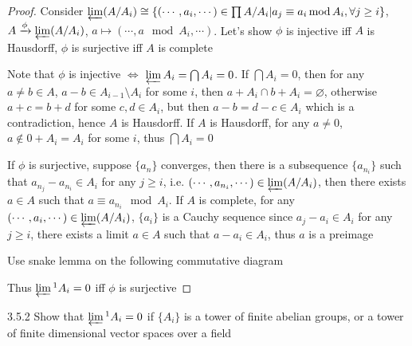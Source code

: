 \documentclass[../main.tex]{subfiles}
\begin{document}
\begin{proof}
Consider $\varprojlim(A/A_i)\cong\left\{(\cdots,a_i,\cdots)\in \prod A/A_i\middle|a_j\equiv a_i\mod A_i, \forall j\geq i\right\}$, $A\xrightarrow\phi\varprojlim(A/A_i)$, $a\mapsto(\cdots,a\mod A_i,\cdots)$. Let's show $\phi$ is injective iff $A$ is Hausdorff, $\phi$ is surjective iff $A$ is complete \par
Note that $\phi$ is injective $\Leftrightarrow$ $\varprojlim A_i=\bigcap A_i=0$. If $\bigcap A_i=0$, then for any $a\neq b\in A$, $a-b\in A_{i-1}\setminus A_{i}$ for some $i$, then $a+A_{i}\cap b+A_i=\varnothing$, otherwise $a+c=b+d$ for some $c,d\in A_i$, but then $a-b=d-c\in A_i$ which is a contradiction, hence $A$ is Hausdorff. If $A$ is Hausdorff, for any $a\neq0$, $a\notin 0+A_i=A_i$ for some $i$, thus $\bigcap A_i=0$ \par
If $\phi$ is surjective, suppose $\{a_n\}$ converges, then there is a subsequence $\{a_{n_i}\}$ such that $a_{n_j}-a_{n_i}\in A_i$ for any $j\geq i$, i.e. $(\cdots,a_{n_i},\cdots)\in \varprojlim(A/A_i)$, then there exists $a\in A$ such that $a\equiv a_{n_i}\mod A_i$. If $A$ is complete, for any $(\cdots,a_i,\cdots)\in\varprojlim(A/A_i)$, $\{a_i\}$ is a Cauchy sequence since $a_j-a_i\in A_i$ for any $j\geq i$, there exists a limit $a\in A$ such that $a-a_i\in A_i$, thus $a$ is a preimage \par
Use snake lemma on the following commutative diagram
\begin{center}
\end{center}
Thus $\varprojlim\textstyle^1A_i=0$ iff $\phi$ is surjective
\end{proof}

\begin{customexercise}{3.5.2}
Show that $\varprojlim\textstyle^1A_i=0$ if $\{A_i\}$ is a tower of finite abelian groups, or a tower of finite dimensional vector spaces over a field
\end{customexercise}
\end{document}
